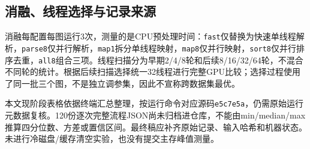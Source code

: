 \subsection{消融、线程选择与记录来源}
消融每配置每图运行3次，测量的是CPU预处理时间：\texttt{fast}仅替换为快速单线程解析，\texttt{parse8}仅并行解析，\texttt{map1}拆分单线程映射，\texttt{map8}仅并行映射，\texttt{sort8}仅并行排序去重，\texttt{all8}组合三项。线程扫描分为早期2/4/8轮和后续8/16/32/64轮，不混合不同轮的统计。根据后续扫描选择统一32线程进行完整GPU比较；选择过程使用了同一批三个图，不是独立调参集，因此不宣称跨数据集最优。

本文现阶段表格依据终端汇总整理，按运行命令对应源码\texttt{e5c7e5a}，仍需原始运行元数据复核。120份逐次完整流程JSON尚未归档进仓库，不能由min/median/max推算四分位数、方差或置信区间。最终稿应补齐原始记录、输入哈希和机器状态。未进行冷磁盘/缓存清空实验，也没有提交主存峰值测量。

